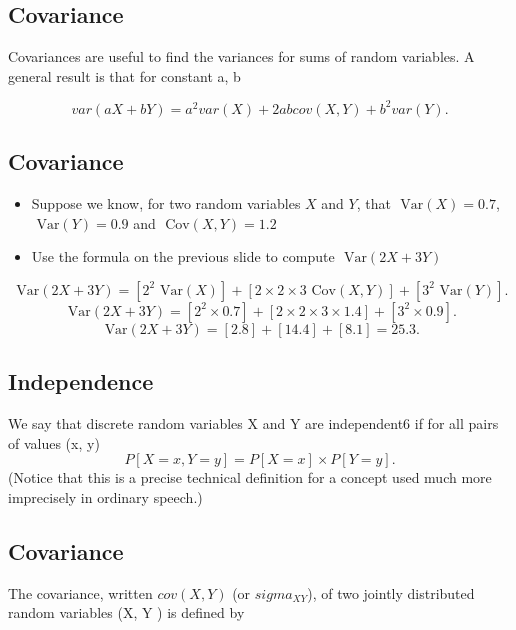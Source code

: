 
			\subsection{Covariance}
			Covariances are useful to find the variances for sums of random variables.
			A general result is that for constant a, b
			
			\[var(aX + bY ) = a^2 var(X) + 2ab cov(X, Y ) + b^2 var(Y ).\]
			
			
			
			\subsection{Covariance}
			\begin{itemize}
				\item Suppose we know, for two random variables $X$ and $Y$, that $\mbox{ Var}(X) =0.7$, $\mbox{ Var}(Y) = 0.9$ and $\mbox{ Cov}(X,Y) = 1.2$
				\item Use the formula on the previous slide to compute $\mbox{ Var}(2X + 3Y )$
				
			\end{itemize}
			
			\[\mbox{ Var}(2X + 3Y ) = [2^2 \mbox{ Var} (X)] + [2\times 2\times 3 \mbox{ Cov}(X, Y )] + [3^2 \mbox{ Var}(Y )].\] \bigskip
			\[\mbox{ Var}(2X + 3Y ) = [2^2 \times 0.7] + [2\times 2\times 3 \times 1.4] +[ 3^2 \times 0.9].\] \bigskip
			\[\mbox{ Var}(2X + 3Y ) = [2.8] + [14.4 ]+ [8.1]= { 25.3}.\]
			
			

			\subsection{Independence}
			
			We say that discrete random variables X and Y are independent6 if for all pairs
			of values (x, y)
			\[ P[X = x, Y = y] = P[X = x] \times P[Y = y].\]
			(Notice that this is a precise
			technical definition for a concept used much more
			imprecisely in ordinary speech.)
			
			
			
			
			
			\subsection{Covariance}
			The covariance, written  $cov(X, Y )$ (or $sigma_{XY}$), of two jointly distributed random
			variables (X, Y ) is defined by
			
